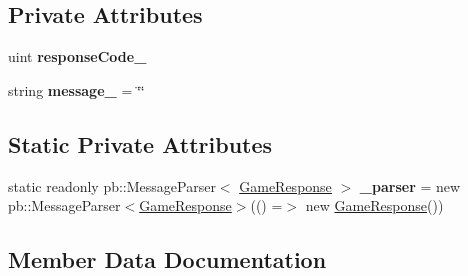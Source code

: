 \subsection*{Private Attributes}
\begin{DoxyCompactItemize}
\item 
\mbox{\label{class_jcoinche_1_1_google_1_1_protobuf_1_1_game_response_a4261664064cb7fe12dc7b81dc8f3f891}} 
uint {\bfseries response\+Code\+\_\+}
\item 
\mbox{\label{class_jcoinche_1_1_google_1_1_protobuf_1_1_game_response_a9c81f2813535c139fac7dc6e129e6e70}} 
string {\bfseries message\+\_\+} = \char`\"{}\char`\"{}
\end{DoxyCompactItemize}
\subsection*{Static Private Attributes}
\begin{DoxyCompactItemize}
\item 
\mbox{\label{class_jcoinche_1_1_google_1_1_protobuf_1_1_game_response_aa2d8dfc75ce5f81b836d5fa786fc507f}} 
static readonly pb\+::\+Message\+Parser$<$ \hyperlink{class_jcoinche_1_1_google_1_1_protobuf_1_1_game_response}{Game\+Response} $>$ {\bfseries \+\_\+parser} = new pb\+::\+Message\+Parser$<$\hyperlink{class_jcoinche_1_1_google_1_1_protobuf_1_1_game_response}{Game\+Response}$>$(() =$>$ new \hyperlink{class_jcoinche_1_1_google_1_1_protobuf_1_1_game_response}{Game\+Response}())
\end{DoxyCompactItemize}


\subsection{Member Data Documentation}
\mbox{\label{class_jcoinche_1_1_google_1_1_protobuf_1_1_game_response_a263587f82936f9e7367f838b7ca082d6}} 
